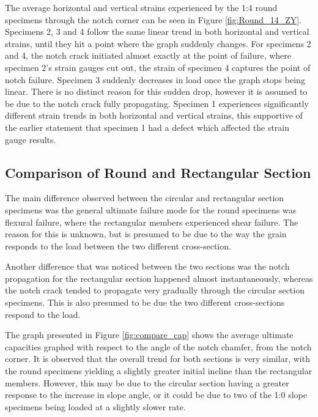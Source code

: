 \documentclass[11pt,a4paper]{article}
\numberwithin{equation}{subsection}
\begin{document}
\noindent
The average horizontal and vertical strains experienced by the 1:4 round specimens through the notch corner can be seen in Figure \ref{fig:Round_14_ZY}. Specimens 2, 3 and 4 follow the same linear trend in both horizontal and vertical strains, until they hit a point where the graph suddenly changes. For specimens 2 and 4, the notch crack initiated almost exactly at the point of failure, where specimen 2's strain gauges cut out, the strain of specimen 4 captures the point of notch failure. Specimen 3 suddenly decreases in load once the graph stops being linear. There is no distinct reason for this sudden drop, however it is assumed to be due to the notch crack fully propagating. Specimen 1 experiences significantly different strain trends in both horizontal and vertical strains, this supportive of the earlier statement that specimen 1 had a defect which affected the strain gauge results.    

\subsection{Comparison of Round and Rectangular Section}
The main difference observed between the circular and rectangular section specimens was the general ultimate failure mode for the round specimens was flexural failure, where the rectangular members experienced shear failure. The reason for this is unknown, but is presumed to be due to the way the grain responds to the load between the two different cross-section. 
\vspace*{\baselineskip}

\noindent
Another difference that was noticed between the two sections was the notch propagation for the rectangular section happened almost instantaneously, whereas the notch crack tended to propagate very gradually through the circular section specimens. This is also presumed to be due the two different cross-sections respond to the load. 

\vspace*{\baselineskip}

\noindent
The graph presented in Figure \ref{fig:compare_cap} shows the average ultimate capacities graphed with respect to the angle of the notch chamfer, from the notch corner. It is observed that the overall trend for both sections is very similar, with the round specimens yielding a slightly greater initial incline than the rectangular members. However, this may be due to the circular section having a greater response to the increase in slope angle, or it could be  due to two of the 1:0 slope specimens being loaded at a slightly slower rate.
\end{document}
